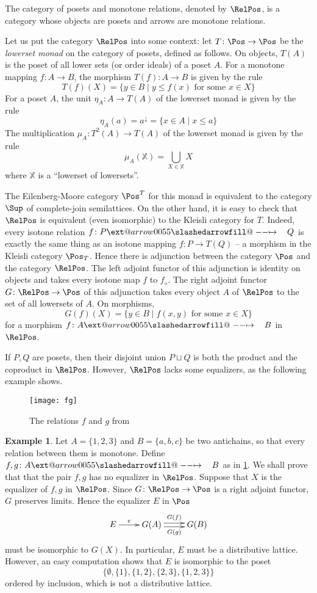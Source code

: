 \documentclass{article}
\makeatletter
\theoremstyle{definition}
\newtheorem{example}[theorem]{Example}
\newcommand{\ladj}[1]{{#1}_\diamond}
\newcommand{\sto}{\xslashedrightarrow{\hskip 1pc}}
\def\slashedarrowfill@#1#2#3#4#5{%
  $\m@th\thickmuskip0mu\medmuskip\thickmuskip\thinmuskip\thickmuskip
  \relax#5#1\mkern-7mu%
  \cleaders\hbox{$#5\mkern-2mu#2\mkern-2mu$}\hfill
  \mathclap{#3}\mathclap{#2}%
  \cleaders\hbox{$#5\mkern-2mu#2\mkern-2mu$}\hfill
  \mkern-7mu#4$%
}
\def\rightslashedarrowfill@{%
  \slashedarrowfill@\relbar\relbar\mapstochar\rightarrow}
\newcommand\xslashedrightarrow[2][]{%
  \ext@arrow 0055{\rightslashedarrowfill@}{#1}{#2}}
\makeatother
\begin{document}
The category of posets and monotone relations, denoted by $\RelPos$, is a category
whose objects are posets and arrows are monotone relations.

Let us put the category $\RelPos$ into some context: let $T\colon\Pos\to\Pos$ be the {\em lowerset monad} on the category of posets,
defined as follows. On objects, $T(A)$ is the poset of all lower sets (or order
ideals) of a poset $A$. For a monotone mapping $f\colon A\to B$, the
morphism $T(f)\colon A\to B$ is given by the rule
$$
T(f)(X)=\{y\in B\mid y\leq f(x)\text{ for some }x\in X\}
$$
For a poset $A$, the unit $\eta_A\colon A\to T(A)$ of the lowerset monad is
given by the rule 
$$
\eta_A(a)=a^\downarrow=\{x\in A\mid x\leq a\}
$$
The multiplication $\mu_A\colon T^2(A)\to T(A)$ of the lowerset monad is given
by the rule 
$$
\mu_A(\mathbb X)=\bigcup_{X\in\mathbb X}X
$$
where $\mathbb X$ is a ``lowerset of lowersets''.

The Eilenberg-Moore category $\Pos^T$ for
this monad is equivalent to the category $\Sup$ of complete-join semilattices.
On the other hand, it is easy to check that $\RelPos$ is equivalent (even
isomorphic) to the Kleisli category for $T$. Indeed, every isotone relation
$f\colon P\sto Q$ is exactly the same thing as an isotone mapping $f\colon P\to
T(Q)$ -- a morphism in the Kleisli category $\Pos_T$. Hence there is adjunction
between the category $\Pos$ and the category $\RelPos$. The left adjoint functor
of this adjunction is identity on objects and takes every isotone map $f$ to $\ladj
f$. The right adjoint functor
$G\colon\RelPos\to\Pos$ of this adjunction takes every object $A$ of 
$\RelPos$ to the set of all lowersets of $A$. On morphisms,
$$
G(f)(X)=\{y\in B\mid f(x,y)\text{ for some }x\in X\}
$$
for a morphism $f\colon A\sto B$ in $\RelPos$.

 
If $P,Q$ are posets, then their disjoint union $P\sqcup Q$ is both the product and
the coproduct in $\RelPos$. However, $\RelPos$ lacks some equalizers, as the
following example shows.
\begin{figure}
\label{fig:fg}
\begin{center}
\texttt{[image: fg]}
\end{center}
\caption{The relations $f$ and $g$ from }
\end{figure}
\begin{example}
\label{ex:fg}
Let $A=\{1,2,3\}$ and $B=\{a,b,c\}$ be two antichains, so that every relation
between them is monotone. Define $f,g\colon A\sto B$ as in \ref{fig:fg}. We shall
prove that that the pair $f,g$ has no equalizer in $\RelPos$. Suppose that
$X$ is the equalizer of $f,g$ in $\RelPos$.
Since
$G\colon\RelPos\to\Pos$ is a right adjoint functor, $G$ preserves limits. Hence the
equalizer $E$ in $\Pos$
$$
\xymatrix{
E
	\ar[r]^-{e}
&
G(A)
	\ar@<.5ex>[r]^-{G(f)}
	\ar@<-.5ex>[r]_-{G(g)}
&
G(B)
}
$$
must be isomorphic to $G(X)$. In particular, $E$ must be a distributive lattice.
However, an easy computation shows that $E$ is isomorphic to
the poset 
$$
\{\emptyset,\{1\},\{1,2\},\{2,3\},\{1,2,3\}\}
$$
ordered by inclusion, which is not a distributive lattice.
\end{example}
\end{document}
